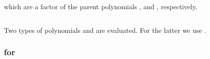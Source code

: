 \documentclass[a4paper,12pt]{article}
\begin{document}
which are a factor of the parent polynomials \coordHE{}, 
\coordHE{} and \coordHE{}, respectively.

\subsection{\coordHE{}}

Two types of polynomials
\coordHE{} and
\coordHE{} are evaluated.
For the latter we use \coordHE{}.

\subsubsection{\coordHE{} for \coordHE{}}
\end{document}
